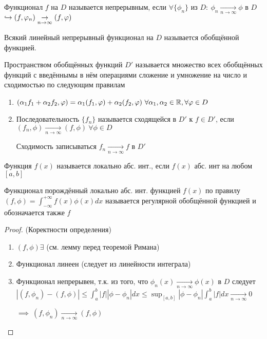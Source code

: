 \documentclass{article}
\begin{document}
\begin{definition}
  Функционал $f$ на $D$ называется непрерывным, если $\forall \{\phi_n\}$ из $D: \ \phi_n \underset{n\to \infty}{\to}\phi$ в $D$
  $\hookrightarrow (f,\varphi_n) \underset{ n \to \infty}{\to }(f,\varphi)$
\end{definition}
\begin{definition}
  Всякий линейный непрерывный функционал на $D$ называется обобщённой функцией.
\end{definition}
\begin{definition}
  Пространством обобщённых функций $D'$ называется множество всех обобщённых функций
  с введённымы в нём операциями сложение и умножение на число и сходимостью по следующим правилам
  \begin{enumerate}
    \item $(\alpha_1f_1+\alpha_2f_2,\phi)=\alpha_1(f_1,\phi)+\alpha_2(f_2,\phi)\ \forall \alpha_1,\alpha_2 \in \R, \forall \phi \in D$
    \item Последовательность $\{f_n\}$ называется сходящейся в $D'$ к $f\in D'$, если
      $(f_n,\phi)\underset{n\to \infty}{\to}(f,\phi) \ \forall \phi\in D$

      Сходимость записываться $f_n \underset{n\to \infty}{\to }f $ в $D'$
  \end{enumerate}
\end{definition}
\begin{definition}
  Функция $f(x)$ называется локально абс. инт., если $f(x)$ абс. инт на любом $[a,b]$
\end{definition}
\begin{definition}
  Функционал порождённый локально абс. инт. функцией $f(x)$ по правилу 
  $(f,\phi)=\int_{-\infty}^{+\infty}f(x)\phi(x)dx$ называется регулярной обобщённой функцией
  и обозначается также $f$
\end{definition}
\begin{proof}(Коректности определения)
  \begin{enumerate}
    \item $(f,\phi)\exists$ (см. лемму перед теоремой Римана)
    \item Функционал линеен (следует из линейности интеграла)
    \item Функционал непрерывен, т.к. из того, что $\phi_n(x)\underset{n\to\infty}{\to}\phi(x)$ в $D$
      следует $|(f,\phi_n)-(f,\phi)|\le \int_{a}^{b}|f||\phi-\phi_n|dx \le \sup_{[a,b]}|\phi-\phi_n|\int_{a}^{b}|f|dx \underset{n\to\infty}{\to}0$

      $\implies \ (f,\phi_n) \underset{ n\to\infty}{\to}(f,\phi)$
  \end{enumerate}
\end{proof}
\end{document}
